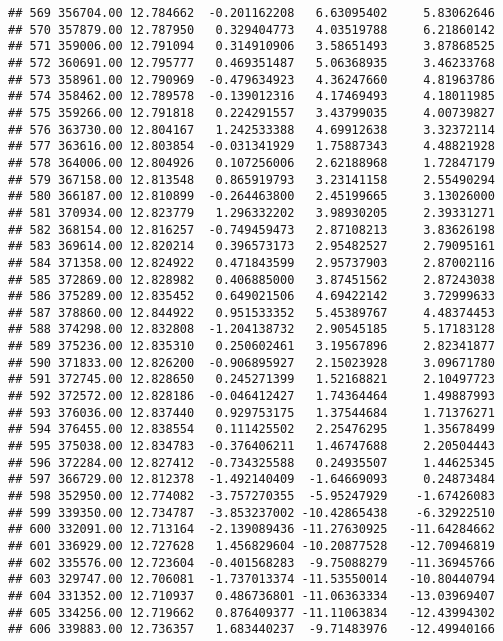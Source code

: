 \documentclass[
]{article}
\begin{document}
\begin{verbatim}
## 569 356704.00 12.784662  -0.201162208   6.63095402     5.83062646
## 570 357879.00 12.787950   0.329404773   4.03519788     6.21860142
## 571 359006.00 12.791094   0.314910906   3.58651493     3.87868525
## 572 360691.00 12.795777   0.469351487   5.06368935     3.46233768
## 573 358961.00 12.790969  -0.479634923   4.36247660     4.81963786
## 574 358462.00 12.789578  -0.139012316   4.17469493     4.18011985
## 575 359266.00 12.791818   0.224291557   3.43799035     4.00739827
## 576 363730.00 12.804167   1.242533388   4.69912638     3.32372114
## 577 363616.00 12.803854  -0.031341929   1.75887343     4.48821928
## 578 364006.00 12.804926   0.107256006   2.62188968     1.72847179
## 579 367158.00 12.813548   0.865919793   3.23141158     2.55490294
## 580 366187.00 12.810899  -0.264463800   2.45199665     3.13026000
## 581 370934.00 12.823779   1.296332202   3.98930205     2.39331271
## 582 368154.00 12.816257  -0.749459473   2.87108213     3.83626198
## 583 369614.00 12.820214   0.396573173   2.95482527     2.79095161
## 584 371358.00 12.824922   0.471843599   2.95737903     2.87002116
## 585 372869.00 12.828982   0.406885000   3.87451562     2.87243038
## 586 375289.00 12.835452   0.649021506   4.69422142     3.72999633
## 587 378860.00 12.844922   0.951533352   5.45389767     4.48374453
## 588 374298.00 12.832808  -1.204138732   2.90545185     5.17183128
## 589 375236.00 12.835310   0.250602461   3.19567896     2.82341877
## 590 371833.00 12.826200  -0.906895927   2.15023928     3.09671780
## 591 372745.00 12.828650   0.245271399   1.52168821     2.10497723
## 592 372572.00 12.828186  -0.046412427   1.74364464     1.49887993
## 593 376036.00 12.837440   0.929753175   1.37544684     1.71376271
## 594 376455.00 12.838554   0.111425502   2.25476295     1.35678499
## 595 375038.00 12.834783  -0.376406211   1.46747688     2.20504443
## 596 372284.00 12.827412  -0.734325588   0.24935507     1.44625345
## 597 366729.00 12.812378  -1.492140409  -1.64669093     0.24873484
## 598 352950.00 12.774082  -3.757270355  -5.95247929    -1.67426083
## 599 339350.00 12.734787  -3.853237002 -10.42865438    -6.32922510
## 600 332091.00 12.713164  -2.139089436 -11.27630925   -11.64284662
## 601 336929.00 12.727628   1.456829604 -10.20877528   -12.70946819
## 602 335576.00 12.723604  -0.401568283  -9.75088279   -11.36945766
## 603 329747.00 12.706081  -1.737013374 -11.53550014   -10.80440794
## 604 331352.00 12.710937   0.486736801 -11.06363334   -13.03969407
## 605 334256.00 12.719662   0.876409377 -11.11063834   -12.43994302
## 606 339883.00 12.736357   1.683440237  -9.71483976   -12.49940166

\end{verbatim}
\end{document}
